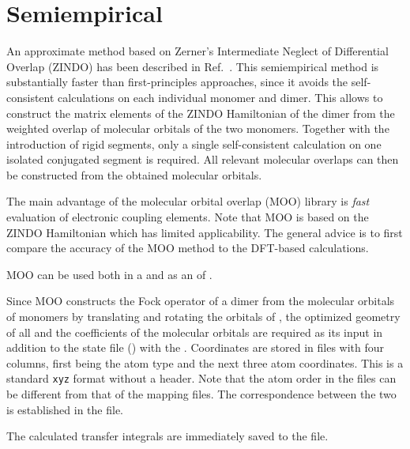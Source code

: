 \section{Semiempirical}
\label{sec:izindo}

\newcommand{\moo}{MOO\xspace}

An approximate method based on Zerner's Intermediate Neglect of Differential Overlap (ZINDO) has been described in Ref.~\cite{kirkpatrick_approximate_2008}. This semiempirical method is substantially faster than first-principles approaches, since it avoids the self-consistent calculations on each individual monomer and dimer. This allows to construct the matrix elements of the ZINDO Hamiltonian of the dimer from the weighted overlap of molecular orbitals of the two monomers. Together with the introduction of rigid segments, only a single self-consistent calculation on one isolated conjugated segment is required. All relevant molecular overlaps can then be constructed from the obtained molecular orbitals.

The main advantage of the molecular orbital overlap (\moo) library is {\em fast} evaluation of electronic coupling elements. Note that \moo is based on the ZINDO Hamiltonian which has limited applicability. The general advice is to first compare the accuracy of the \moo method to the DFT-based calculations. 

\moo can be used both in a  and as an  \calculator of \votcactp. 

Since \moo constructs the Fock operator of a dimer from the  molecular orbitals of monomers by translating and rotating the orbitals of , the optimized geometry of all  and the coefficients of the molecular orbitals are required as its input in addition to the state file (\sqlstate) with the . Coordinates are stored in \xyz files with four columns, first being the atom type and the next three atom coordinates. This is a standard \texttt{xyz} format without a header. Note that the atom order in the \xyz files can be different from that of the mapping files. The correspondence between the two is established in the \xmlcsg file. 


The calculated transfer integrals are immediately saved to the \sqlstate file.


